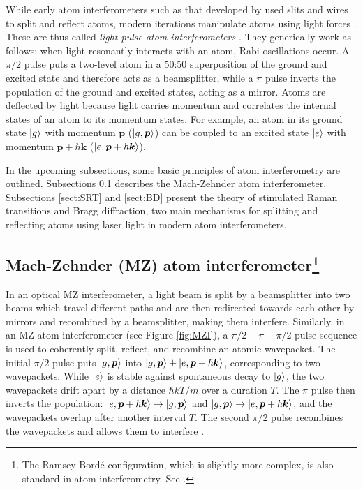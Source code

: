 \documentclass[reprint,
nofootinbib,
amsmath,amssymb,
aps]{revtex4-1}
\begin{document}
While early atom interferometers such as that developed by \cite{keith1991interferometer} used slits and wires to split and reflect atoms, modern iterations manipulate atoms using light forces \cite{rasel1995atom}. These are thus called \textit{light-pulse atom interferometers} \cite{kasevich1992measurement}. They generically work as follows: when light resonantly interacts with an atom, Rabi oscillations occur. A $\pi/2$ pulse puts a two-level atom in a 50:50 superposition of the ground and excited state and therefore acts as a beamsplitter, while a $\pi$ pulse inverts the population of the ground and excited states, acting as a mirror.  Atoms are deflected by light because light carries momentum and correlates the internal states of an atom to its momentum states. For example, an atom in its ground state $\ket{g}$ with momentum $\bm{p}$ ($\ket{g,\bm{p}}$) can be coupled to an excited state $\ket{e}$ with momentum $\bm{p} + \hbar \bm{k}$ ($\ket{e,\bm{p} + \hbar\bm{k}}$).  



In the upcoming subsections, some basic principles of atom interferometry are outlined. Subsections \ref{sect:MZI} describes the Mach-Zehnder atom interferometer. Subsections \ref{sect:SRT} and \ref{sect:BD} present the theory of stimulated Raman transitions and Bragg diffraction, two main mechanisms for splitting and reflecting atoms using laser light in modern atom interferometers.  





\subsection{Mach-Zehnder (MZ) atom interferometer\footnote{The Ramsey-Bord\'{e} configuration, which is slightly more complex, is also standard in atom interferometry. See \cite{mueller2014quantum}.}}\label{sect:MZI}

In an optical MZ interferometer,  a light beam is split by a beamsplitter into two beams which travel different paths and are then redirected towards each other by mirrors and recombined by a beamsplitter, making them interfere. Similarly, in an MZ atom interferometer (see Figure \ref{fig:MZI}), a $\pi/2-\pi-\pi/2$ pulse sequence is used to coherently split, reflect, and recombine an atomic wavepacket. The initial $\pi/2$ pulse puts $\ket{g,\bm{p}}$ into $\ket{g,\bm{p}} + \ket{e,\bm{p} + \hbar \bm{k}}$, corresponding to two wavepackets. While $\ket{e}$ is stable against spontaneous decay to $\ket{g}$, the two wavepackets drift apart by a distance $\hbar kT /m$ over a duration $T$. The $\pi$ pulse then inverts the population: $\ket{e,\bm{p} + \hbar \bm{k}} \to \ket{g, \bm{p}}$ and $\ket{g,\bm{p}} \to \ket{e,\bm{p} + \hbar \bm{k}}$, and the wavepackets overlap after another interval $T$. The second $\pi/2$ pulse recombines the wavepackets and allows them to interfere \cite{kasevich1992measurement}.
\end{document}
